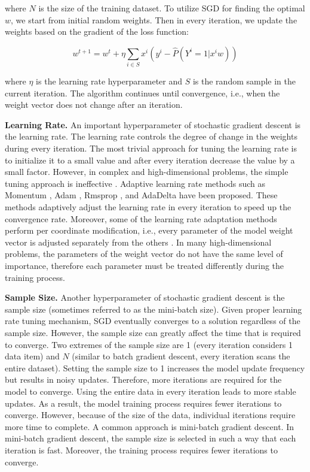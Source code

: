 where $N$ is the size of the training dataset.
To utilize SGD for finding the optimal $w$, we start from initial random weights.
Then in every iteration, we update the weights based on the gradient of the loss function:

\begin{equation}
{w}^{t+1} = {w}^t + \eta \sum_{i \in S} x^i (y^i - \hat{P}(Y^i = 1 | x^i w))
\end{equation}

where $\eta$ is the learning rate hyperparameter and $S$ is the random sample in the current iteration.
The algorithm continues until convergence, i.e., when the weight vector does not change after an iteration.

\textbf{Learning Rate.}
An important hyperparameter of stochastic gradient descent is the learning rate.
The learning rate controls the degree of change in the weights during every iteration.
The most trivial approach for tuning the learning rate is to initialize it to a small value and after every iteration decrease the value by a small factor.
However, in complex and high-dimensional problems, the simple tuning approach is ineffective \cite{schaul2013no}. 
Adaptive learning rate methods such as Momentum \cite{qian1999momentum}, Adam \cite{kingma2014adam}, Rmsprop \cite{tieleman2012lecture}, and AdaDelta \cite{zeiler2012adadelta} have been proposed.
These methods adaptively adjust the learning rate in every iteration to speed up the convergence rate.
Moreover, some of the learning rate adaptation methods perform per coordinate modification, i.e., every parameter of the model weight vector is adjusted separately from the others \cite{kingma2014adam, tieleman2012lecture, zeiler2012adadelta}. 
In many high-dimensional problems, the parameters of the weight vector do not have the same level of importance, therefore each parameter must be treated differently during the training process.

\textbf{Sample Size.}
Another hyperparameter of stochastic gradient descent is the sample size (sometimes referred to as the mini-batch size).
Given proper learning rate tuning mechanism, SGD eventually converges to a solution regardless of the sample size.
However, the sample size can greatly affect the time that is required to converge.
Two extremes of the sample size are 1 (every iteration considers 1 data item) and $N$ (similar to batch gradient descent, every iteration scans the entire dataset).
Setting the sample size to 1 increases the model update frequency but results in noisy updates.
Therefore, more iterations are required for the model to converge.
Using the entire data in every iteration leads to more stable updates.
As a result, the model training process requires fewer iterations to converge.
However, because of the size of the data, individual iterations require more time to complete.
A common approach is mini-batch gradient descent.
In mini-batch gradient descent, the sample size is selected in such a way that each iteration is fast.
Moreover, the training process requires fewer iterations to converge.


